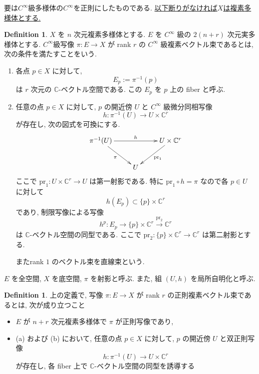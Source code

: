 \documentclass[dvipdfmx,a4paper,11pt]{article} %
\theoremstyle{definition}
\newtheorem{defn}[thm]{Definition}
\theoremstyle{remark}
\numberwithin{equation}{section}
\begin{document}
要は$C^\infty$級多様体の$C^\infty$を正則にしたものである. 
\underline{以下断りがなければ$X$は複素多様体とする. }
\begin{defn}
\(X\) を \(n\) 次元複素多様体とする. \(E\) を \(C^\infty\) 級の \(2(n+r)\) 次元実多様体とする. $C^\infty$級写像 \(\pi\colon E\longrightarrow X\) が rank \(r\) の \(C^\infty\) 級複素ベクトル束であるとは, 次の条件を満たすことをいう.
\begin{enumerate}
\item[(a)] 各点 \(p\in X\) に対して,
\[
E_p:=\pi^{-1}(p)
\]
は \(r\) 次元の \(\mathbb{C}\)-ベクトル空間である. この \(E_p\) を \(p\) 上の fiber と呼ぶ.
\item[(b)] 任意の点 \(p\in X\) に対して, \(p\) の開近傍 \(U\) と \(C^\infty\) 級微分同相写像
\[
h\colon \pi^{-1}(U)\longrightarrow U\times \mathbb{C}^r
\]
が存在し, 次の図式を可換にする.
\[
\xymatrix{
\pi^{-1}(U) \ar[rr]^{h} \ar[dr]_{\pi} && U\times \mathbb{C}^r \ar[dl]^{\mathrm{pr}_1} \\
& U &
}
\]
ここで \(\mathrm{pr}_1\colon U\times \mathbb{C}^r\to U\) は第一射影である. 
特に
\(
\mathrm{pr}_1\circ h=\pi
\)
 なので各 \(p\in U\) に対して 
 \[
h(E_p) \subset \{p\}\times \mathbb{C}^r\]
であり, 制限写像による写像
\[
h^p\colon E_p\longrightarrow \{p\}\times \mathbb{C}^r \overset{\mathrm{pr}_2}{\longrightarrow} \mathbb{C}^r
\]
は \(\mathbb{C}\)-ベクトル空間の同型である. 
ここで \(\mathrm{pr}_2\colon \{p\}\times \mathbb{C}^r\to \mathbb{C}^r\) は第二射影とする.

またrank \(1\) のベクトル束を直線束という.
\end{enumerate}
\(E\) を全空間, \(X\) を底空間, \(\pi\) を射影と呼ぶ. また, 組 \((U,h)\) を局所自明化と呼ぶ.
\end{defn}
\begin{defn}
上の定義で, 写像 \(\pi\colon E\longrightarrow X\) が rank \(r\) の正則複素ベクトル束であるとは, 次が成り立つこと
\begin{itemize}
\item \(E\) が \(n+r\) 次元複素多様体で \(\pi\) が正則写像であり, 
\item (a) および (b) において, 任意の点 \(p\in X\) に対して, \(p\) の開近傍 \(U\) と双正則写像
\[
h\colon \pi^{-1}(U)\longrightarrow U\times \mathbb{C}^r
\]
が存在し, 各 fiber 上で \(\mathbb{C}\)-ベクトル空間の同型を誘導する
\end{itemize}

\end{defn}
\end{document}
